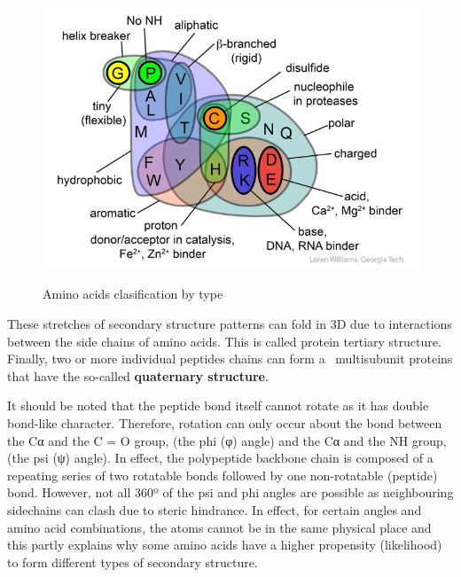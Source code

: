 \documentclass[
  letterpaper,
  DIV=11,
  numbers=noendperiod]{scrreprt}
\begin{document}
\begin{figure}

{\centering 

\href{https://www.reddit.com/r/chemistry/comments/acyald/venn_diagram_showing_the_properties_of_the_20/}{\includegraphics{./pics/aa.png}}

}

\caption{Amino acids clasification by type}

\end{figure}

These stretches of secondary structure patterns can fold in 3D due to
interactions between the side chains of amino acids. This is called
protein tertiary structure. Finally, two or more individual peptides
chains can form a~ multisubunit proteins that have the so-called
\textbf{quaternary structure}.

It should be noted that the peptide bond itself cannot rotate as it has
double bond-like character. Therefore, rotation can only occur about the
bond between the Cα and the C = O group, (the phi (φ) angle) and the Cα
and the NH group, (the psi (ψ) angle). In effect, the polypeptide
backbone chain is composed of a repeating series of two rotatable bonds
followed by one non-rotatable (peptide) bond. However, not all 360º of
the psi and phi angles are possible as neighbouring sidechains can clash
due to steric hindrance. In effect, for certain angles and amino acid
combinations, the atoms cannot be in the same physical place and this
partly explains why some amino acids have a higher propensity
(likelihood) to form different types of secondary structure.
\end{document}
